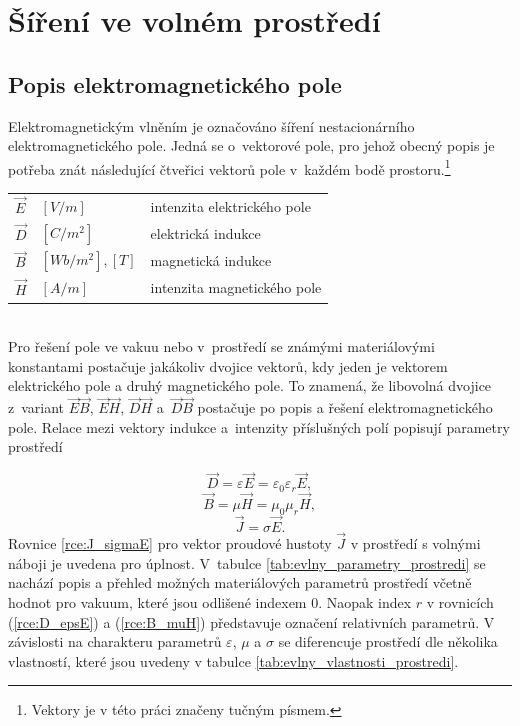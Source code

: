 
\section{Šíření ve volném prostředí} \label{sec:evlny_volne_prostredi}
\subsection{Popis elektromagnetického pole}
Elektromagnetickým vlněním je označováno šíření nestacionárního elektromagnetického pole. Jedná se o~vektorové pole, pro jehož obecný popis je potřeba znát následující čtveřici vektorů pole v~každém bodě prostoru.\footnote{Vektory je v této práci značeny tučným písmem.}\\ 

\begin{tabular}{lll}
$\vec E$ & $\unit{[V/m]}$ & intenzita elektrického pole\\
$\vec D$ & $\unit{[C/m^{2}]}$ & elektrická indukce\\
$\vec B$ & $\unit{[Wb/m^{2}],[T]}$ & magnetická indukce\\
$\vec H$ & $\unit{[A/m]}$ & intenzita magnetického pole\\
\end{tabular}\bigskip \\
Pro řešení pole ve vakuu nebo v~prostředí se známými materiálovými konstantami postačuje jakákoliv dvojice vektorů, kdy jeden je vektorem elektrického pole a druhý magnetického pole. To znamená, že libovolná dvojice z~variant $\vec E\vec B$, $\vec E\vec H$, $\vec D\vec H$ a~$\vec D\vec B$ postačuje po popis a řešení elektromagnetického pole.
Relace mezi vektory indukce a~intenzity příslušných polí popisují parametry prostředí 

\begin{equation}
	\vec D = \varepsilon\vec E = \varepsilon_{0}\varepsilon_{r}\vec E,
	\label{rce:D_epsE}
\end{equation}
\begin{equation}
	\vec B = \mu\vec H = \mu_{0}\mu_{r}\vec H,
	\label{rce:B_muH}
\end{equation}
\begin{equation}
	\vec J = \sigma\vec E.
	\label{rce:J_sigmaE}
\end{equation}
Rovnice \ref{rce:J_sigmaE} pro vektor proudové hustoty $\vec J$ v prostředí s volnými náboji je uvedena pro úplnost. V~tabulce \ref{tab:evlny_parametry_prostredi} se nachází popis a přehled možných materiálových parametrů prostředí včetně hodnot pro vakuum, které jsou odlišené indexem $0$. Naopak index $r$ v rovnicích (\ref{rce:D_epsE}) a (\ref{rce:B_muH}) představuje označení relativních parametrů. V závislosti na charakteru parametrů $\varepsilon$, $\mu$ a $\sigma$ se diferencuje prostředí dle několika vlastností, které jsou uvedeny v tabulce \ref{tab:evlny_vlastnosti_prostredi}.

